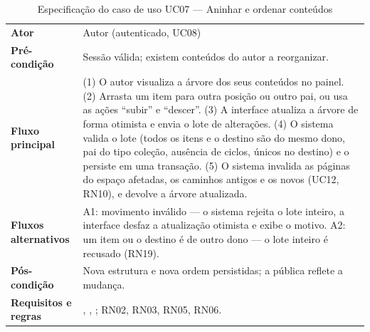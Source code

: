 \begin{table}[htb]
\caption{Especificação do caso de uso UC07 --- Aninhar e ordenar conteúdos}\label{tab:uc07}
\small
\begin{tabularx}{\linewidth}{@{}L{3.0cm}Y@{}}
\toprule
\textbf{Ator} & Autor (autenticado, UC08)\\
\textbf{Pré-condição} & Sessão válida; existem conteúdos do autor a reorganizar.\\
\textbf{Fluxo principal} & (1) O autor visualiza a árvore dos seus conteúdos no painel. (2) Arrasta um item para outra posição ou outro pai, ou usa as ações ``subir'' e ``descer''. (3) A interface atualiza a árvore de forma otimista e envia o lote de alterações. (4) O sistema valida o lote (todos os itens e o destino são do mesmo dono, pai do tipo coleção, ausência de ciclos,  únicos no destino) e o persiste em uma transação. (5) O sistema invalida as páginas do espaço afetadas, os caminhos antigos e os novos (UC12, RN10), e devolve a árvore atualizada.\\
\textbf{Fluxos alternativos} & A1: movimento inválido --- o sistema rejeita o lote inteiro, a interface desfaz a atualização otimista e exibe o motivo. A2: um item ou o destino é de outro dono --- o lote inteiro é recusado (RN19).\\
\textbf{Pós-condição} & Nova estrutura e nova ordem persistidas; a  pública reflete a mudança.\\
\textbf{Requisitos e regras} & , , ; RN02, RN03, RN05, RN06.\\
\bottomrule
\end{tabularx}
\end{table}

